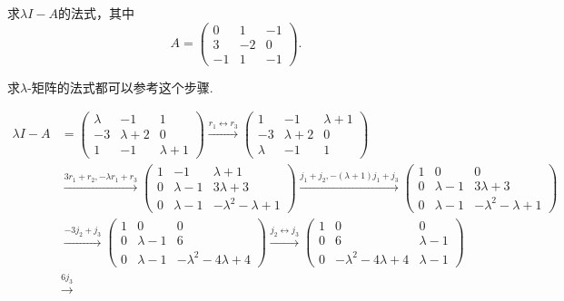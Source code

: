 \documentclass[../../main.tex]{subfiles}
\begin{document}
\begin{example}
求$\lambda I - A$的法式，其中
\[A = \begin{pmatrix}
0 & 1 & -1 \\
3 & -2 & 0 \\
-1 & 1 & -1
\end{pmatrix}.\]
\end{example}
\begin{remark}
求$\lambda$-矩阵的法式都可以参考这个步骤.
\end{remark}
\begin{solution}
\begin{align*}
\lambda I - A &= 
\begin{pmatrix}
\lambda & -1 & 1 \\
-3 & \lambda + 2 & 0 \\
1 & -1 & \lambda + 1
\end{pmatrix}
\xrightarrow{r_1\leftrightarrow r_3}
\begin{pmatrix}
1 & -1 & \lambda + 1 \\
-3 & \lambda + 2 & 0 \\
\lambda & -1 & 1
\end{pmatrix}\\
&\xrightarrow{3r_1+r_2,-\lambda r_1+r_3}
\begin{pmatrix}
1 & -1 & \lambda + 1 \\
0 & \lambda - 1 & 3\lambda + 3 \\
0 & \lambda - 1 & -\lambda^2 - \lambda + 1
\end{pmatrix}
\xrightarrow{j_1+j_2,-(\lambda +1)j_1+j_3}
\begin{pmatrix}
1 & 0 & 0 \\
0 & \lambda - 1 & 3\lambda + 3 \\
0 & \lambda - 1 & -\lambda^2 - \lambda + 1
\end{pmatrix}\\
&\xrightarrow{-3j_2+j_3}
\begin{pmatrix}
1 & 0 & 0 \\
0 & \lambda - 1 & 6 \\
0 & \lambda - 1 & -\lambda^2 - 4\lambda + 4
\end{pmatrix}
\xrightarrow{j_2\leftrightarrow j_3}
\begin{pmatrix}
1 & 0 & 0 \\
0 & 6 & \lambda - 1 \\
0 & -\lambda^2 - 4\lambda + 4 & \lambda - 1
\end{pmatrix}\\
&\xrightarrow{6j_3}

\end{align*}
\end{solution}
\end{document}
